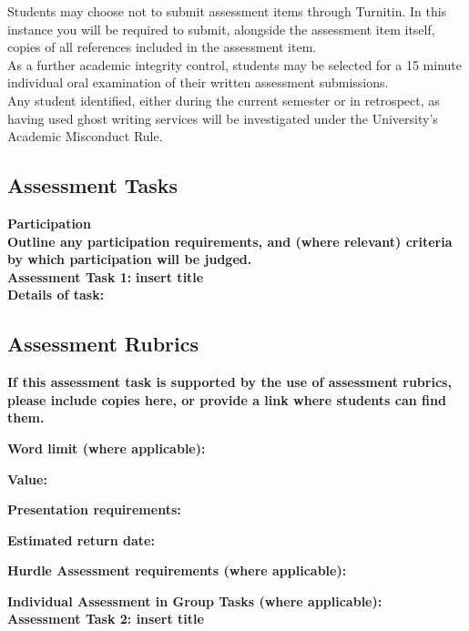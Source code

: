 \documentclass[11pt]{article}
\begin{document}
Students may choose not to submit assessment items through Turnitin. In this instance you will be required to submit, alongside the assessment item itself, copies of all references included in the assessment item. \\

{\color{ForestGreen}
As a further academic integrity control, students may be selected for a 15 minute individual oral examination of their written assessment submissions. \\

Any student identified, either during the current semester or in retrospect, as having used ghost writing services will be investigated under the University’s Academic Misconduct Rule. \\
}

\subsection*{Assessment Tasks}
\textbf{Participation} \\

{\bfseries\color{red}Outline any participation requirements, and (where relevant) criteria by which participation will be judged.} \\

\textbf{Assessment Task 1:} {\bfseries\color{red}insert title} \\

\textbf{Details of task:}

\subsection*{Assessment Rubrics} 

{\bfseries\color{red}If this assessment task is supported by the use of assessment rubrics, please include copies here, or provide a link where students can find them.}

\textbf{Word limit (where applicable):}

\textbf{Value:}

\textbf{Presentation requirements:}

\textbf{Estimated return date:}

\textbf{Hurdle Assessment requirements (where applicable):}

\textbf{Individual Assessment in Group Tasks (where applicable):} \\

\textbf{Assessment Task 2: {\color{red}insert title}} \\
\end{document}
